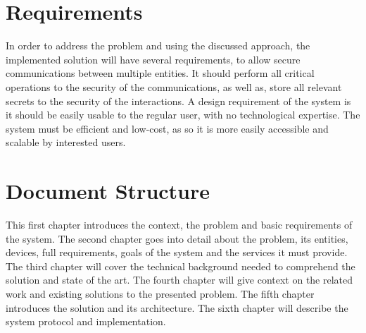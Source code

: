 \section{Requirements}\label{chap:intro:requirements}

In order to address the problem and using the discussed approach, the implemented solution will have several requirements, to allow secure communications between multiple entities.
It should perform all critical operations to the security of the communications, as well as, store all relevant secrets to the security of the interactions.
A design requirement of the system is it should be easily usable to the regular user, with no technological expertise. The system must be efficient and low-cost, as so it is more easily accessible and scalable by interested users.

\section{Document Structure}\label{chap:intro:doc}

This first chapter introduces the context, the problem and basic requirements of the system.
The second chapter goes into detail about the problem, its entities, devices, full requirements, goals of the system and the services it must provide.
The third chapter will cover the technical background needed to comprehend the solution and state of the art.
The fourth chapter will give context on the related work and existing solutions to the presented problem.
The fifth chapter introduces the solution and its architecture. The sixth chapter will describe the system protocol and implementation.
